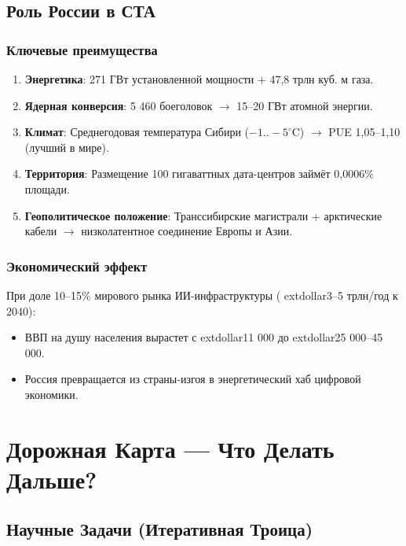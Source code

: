 \documentclass[11pt, a4paper]{article}
\begin{document}
\subsection{Роль России в СТА}
\subsubsection*{Ключевые преимущества}
\begin{enumerate}
    \item \textbf{Энергетика}: 271 ГВт установленной мощности + 47,8 трлн куб. м газа.
    \item \textbf{Ядерная конверсия}: 5 460 боеголовок $\rightarrow$ 15--20 ГВт атомной энергии.
    \item \textbf{Климат}: Среднегодовая температура Сибири ($-1 .. -5^\circ$C) $\rightarrow$ PUE 1,05--1,10 (лучший в мире).
    \item \textbf{Территория}: Размещение 100 гигаваттных дата-центров займёт 0,0006\% площади.
    \item \textbf{Геополитическое положение}: Транссибирские магистрали + арктические кабели $\rightarrow$ низколатентное соединение Европы и Азии.
\end{enumerate}

\subsubsection*{Экономический эффект}
При доле 10--15\% мирового рынка ИИ-инфраструктуры (	extdollar3--5 трлн/год к 2040):
\begin{itemize}
    \item ВВП на душу населения вырастет с 	extdollar11 000 до 	extdollar25 000--45 000.
    \item Россия превращается из страны-изгоя в энергетический хаб цифровой экономики.
\end{itemize}

\section{Дорожная Карта --- Что Делать Дальше?}

\subsection{Научные Задачи (Итеративная Троица)}
\end{document}
